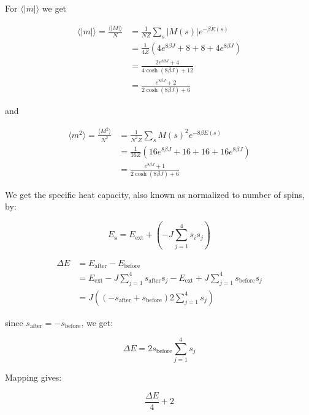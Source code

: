 \documentclass[english,notitlepage,reprint,nofootinbib]{revtex4-1}  %
\begin{document}
For $\langle|m|\rangle$ we get

\begin{align*}
    \langle|m|\rangle  = \frac{\langle|M|\rangle}{N} &= \frac{1}{N Z} \sum\limits_{s} |M(s)| e^{- \beta E(s)} \\
    &= \frac{1}{4 Z} \left( 4 e^{8 \beta J} + 8 + 8 + 4 e^{8 \beta J} \right) \\
    &= \frac{2 e^{8 \beta J}  + 4}{4 \cosh (8 \beta J) + 12} \\
    &= \frac{e^{8 \beta J}  + 2}{2 \cosh (8 \beta J) + 6}
\end{align*}

and 

\begin{align*}
    \langle m^2\rangle = \frac{\langle M^2\rangle}{N^2} &= \frac{1}{N^2 Z} \sum\limits_{s} M(s)^2 e^{-8 \beta E(s)} \\
    &= \frac{1}{16 Z} \left( 16 e^{8 \beta J} + 16 + 16 + 16 e^{8 \beta J} \right) \\
    &= \frac{e^{8 \beta J}  + 1}{2 \cosh (8 \beta J) + 6}
\end{align*}

We get the specific heat capacity, also known as normalized to number of spins, by:

\begin{equation}
    E_{\mathbf{s}} = E_{\text{ext}} + \left( -J \sum\limits_{j = 1}^4 s_i s_j \right)
\end{equation}

\begin{align*}
    \Delta E &= E_{\text{after}} - E_{\text{before}} \\
    &= E_{\text{ext}} - J \sum\limits_{j = 1}^4 s_{\text{after}} s_j - E_{\text{ext}} + J \sum\limits_{j = 1}^4 s_{\text{before}} s_j \\
    &= J \left( \left( -s_ \text{after} + s_{\text{before}} \right) 2 \sum\limits_{j = 1}^4 s_j \right)
\end{align*}

since $s_{\text{after}} = - s_{\text{before}}$, we get:

\begin{equation}
    \Delta E = 2 s_{\text{before}} \sum\limits_{j = 1}^4 s_j
\end{equation}

Mapping gives:

\begin{equation}
    \frac{\Delta E}{4} + 2
\end{equation}
\end{document}
